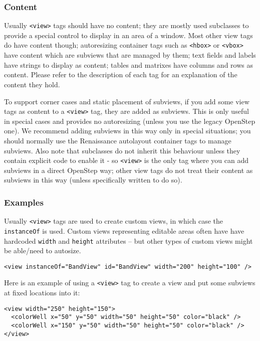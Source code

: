 \subsubsection{Content}
Usually \texttt{<view>} tags should have no content; they are mostly
used subclasses to provide a special control to display in an area of
a window.  Most other view tags do have content though; autoresizing
container tags such as \texttt{<hbox>} or \texttt{<vbox>} have content
which are subviews that are managed by them; text fields and labels
have strings to display as content; tables and matrixes have columns
and rows as content.  Please refer to the description of each tag for
an explanation of the content they hold.

To support corner cases and static placement of subviews, if you add
some view tags as content to a \texttt{<view>} tag, they are added as
subviews.  This is only useful in special cases and provides no
autoresizing (unless you use the legacy OpenStep one).  We recommend
adding subviews in this way only in special situations; you should
normally use the Renaissance autolayout container tags to manage
subviews.  Also note that subclasses do not inherit this behaviour
unless they contain explicit code to enable it - so \texttt{<view>} is
the only tag where you can add subviews in a direct OpenStep way;
other view tags do not treat their content as subviews in this way
(unless specifically written to do so).

\subsubsection{Examples}
Usually \texttt{<view>} tags are used to create custom views, in which
case the \texttt{instanceOf} is used.  Custom views representing
editable areas often have have hardcoded \texttt{width} and
\texttt{height} attributes -- but other types of custom views might
be able/need to autosize.
\begin{verbatim}
<view instanceOf="BandView" id="BandView" width="200" height="100" />
\end{verbatim}

Here is an example of using a \texttt{<view>} tag to create a view and
put some subviews at fixed locations into it:
\begin{verbatim}
<view width="250" height="150">
  <colorWell x="50" y="50" width="50" height="50" color="black" />
  <colorWell x="150" y="50" width="50" height="50" color="black" />
</view>
\end{verbatim}

